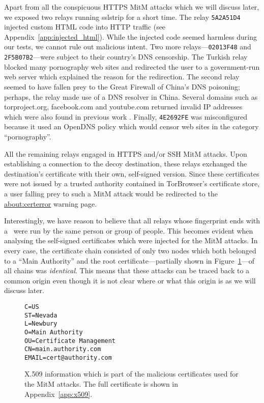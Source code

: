 \documentclass[letterpaper,twocolumn,10pt]{article}
\begin{document}
Apart from all the conspicuous HTTPS MitM attacks which we will discuss later, we exposed two relays
running \textsf{sslstrip} for a short time.  The relay \texttt{5A2A51D4} injected custom HTML code
into HTTP traffic (see Appendix~\ref{app:injected_html}).  While the injected code seemed harmless
during our tests, we cannot rule out malicious intent.  Two more relays---\texttt{02013F48} and
\texttt{2F5B07B2}---were subject to their country's DNS censorship.  The Turkish relay blocked many
pornography web sites and redirected the user to a government-run web server which explained the
reason for the redirection.  The second relay seemed to have fallen prey to the Great Firewall of
China's DNS poisoning; perhaps, the relay made use of a DNS resolver in China.  Several domains such
as torproject.org, facebook.com and youtube.com returned invalid IP addresses which were also found
in previous work \cite{Lowe2007}.  Finally, \texttt{4E2692FE} was misconfigured because it used an
OpenDNS policy which would censor web sites in the category ``pornography''.

All the remaining relays engaged in HTTPS and/or SSH MitM attacks.  Upon establishing a connection
to the decoy destination, these relays exchanged the destination's certificate with their own,
self-signed version.  Since these certificates were not issued by a trusted authority contained in
TorBrowser's certificate store, a user falling prey to such a MitM attack would be redirected to the
\url{about:certerror} warning page.

Interestingly, we have reason to believe that all relays whose fingerprint ends with a \dag\ were
run by the same person or group of people.  This becomes evident when analysing the self-signed
certificates which were injected for the MitM attacks.  In every case, the certificate chain
consisted of only two nodes which both belonged to a ``Main Authority'' and the root
certificate---partially shown in Figure~\ref{lst:certificate}---of all chains was \emph{identical}.
This means that these attacks can be traced back to a common origin even though it is not clear
where or what this origin is as we will discuss later.

\begin{figure}[t]
\begin{lstlisting}
C=US
ST=Nevada
L=Newbury
O=Main Authority
OU=Certificate Management
CN=main.authority.com
EMAIL=cert@authority.com
\end{lstlisting}
\caption{X.509 information which is part of the malicious certificates used for the MitM attacks.
	The full certificate is shown in Appendix~\ref{app:x509}.}
\label{lst:certificate}
\end{figure}
\end{document}
